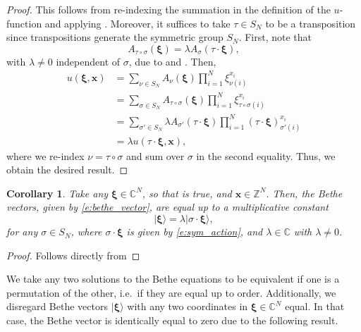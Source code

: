 \documentclass[a4paper,11pt]{article}
\newtheorem{corollary}[theorem]{Corollary}
\theoremstyle{definition}
\begin{document}
\begin{proof}
    This follows from re-indexing the summation in the definition of the $u$-function and applying . Moreover, it suffices to take $\tau \in S_N$ to be a transposition since transpositions generate the symmetric group $S_N$. First, note that
    \begin{equation}
    A_{\tau \circ \sigma}(\boldsymbol{\xi}) = \lambda A_{\sigma}(\tau \cdot \boldsymbol{\xi}),
    \end{equation}
    with $\lambda \neq 0$ independent of $\sigma$, due to  and . Then,
    \begin{equation}
    \begin{split}
    u(\boldsymbol{\xi}, \mathbf{x}) &= \sum_{\nu \in S_N} A_{\nu}(\boldsymbol{\xi}) \prod_{i=1}^N \xi_{\nu(i)}^{x_i}\\
    &= \sum_{\sigma \in S_N} A_{\tau \circ \sigma}(\boldsymbol{\xi}) \prod_{i=1}^N \xi_{\tau \circ \sigma(i)}^{x_i}\\
    &= \sum_{\sigma' \in S_N} \lambda A_{\sigma'}(\tau \cdot \boldsymbol{\xi}) \prod_{i=1}^N (\tau\cdot\boldsymbol{\xi})_{\sigma'(i)}^{x_i}\\
    &= \lambda u(\tau \cdot \boldsymbol{\xi}, \mathbf{x}),
    \end{split}
    \end{equation}
    where we re-index $\nu = \tau \circ \sigma$ and sum over $\sigma$ in the second equality. Thus, we obtain the desired result. 
\end{proof}

\begin{corollary}\label{c:sym_bethe_vec}
Take any $\boldsymbol{\xi} \in \mathbb{C}^N$, so that  is true, and $\mathbf{x}\in \mathbb{Z}^N$. Then, the Bethe vectors, given by \eqref{e:bethe_vector}, are equal up to a multiplicative constant
    \begin{equation}
    |\boldsymbol{\xi} \rangle = \lambda |\sigma \cdot \boldsymbol{\xi} \rangle,
    \end{equation}
for any $\sigma \in S_N$, where $\sigma \cdot \boldsymbol{\xi}$ is given by \eqref{e:sym_action}, and $\lambda \in \mathbb{C}$ with $\lambda \neq 0$.
\end{corollary}

\begin{proof}
Follows directly from 
\end{proof}

We take any two solutions to the Bethe equations to be equivalent if one is a permutation of the other, i.e.~if they are equal up to order. Additionally, we disregard Bethe vectors $|\boldsymbol{\xi}\rangle$ with any two coordinates in $\boldsymbol{\xi} \in \mathbb{C}^N$ equal. In that case, the Bethe vector is identically equal to zero due to the following result. 
\end{document}
